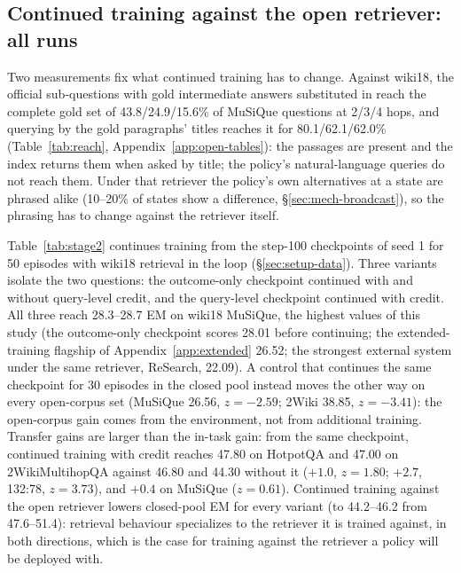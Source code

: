 \subsection{Continued training against the open retriever: all runs}
\label{app:stage2}
Two measurements fix what continued training has to change. Against
wiki18, the official sub-questions with gold intermediate answers
substituted in reach the complete gold set of 43.8/24.9/15.6\% of
MuSiQue questions at 2/3/4 hops, and querying by the gold paragraphs'
titles reaches it for 80.1/62.1/62.0\% (Table~\ref{tab:reach},
Appendix~\ref{app:open-tables}): the passages are present and the index
returns them when asked by title; the policy's natural-language queries
do not reach them. Under that retriever the policy's own alternatives
at a state are phrased alike (10--20\% of states show a difference,
\S\ref{sec:mech-broadcast}), so the phrasing has to change against the
retriever itself.

Table~\ref{tab:stage2} continues training from the step-100
checkpoints of seed 1 for 50 episodes with wiki18 retrieval in the
loop (\S\ref{sec:setup-data}). Three variants isolate the two questions:
the outcome-only checkpoint continued with and without query-level
credit, and the query-level checkpoint continued with credit. All
three reach 28.3--28.7 EM on wiki18 MuSiQue, the highest values of
this study (the outcome-only checkpoint scores 28.01 before continuing;
the extended-training flagship of Appendix~\ref{app:extended} 26.52; the strongest
external system under the same retriever, ReSearch, 22.09). A control
that continues the same checkpoint for 30 episodes in the closed pool
instead moves the other way on every open-corpus set (MuSiQue 26.56,
$z=-2.59$; 2Wiki 38.85, $z=-3.41$): the open-corpus gain comes from the
environment, not from additional training. Transfer gains are larger
than the in-task gain: from the same checkpoint, continued training with
credit reaches 47.80 on HotpotQA and 47.00 on 2WikiMultihopQA against
46.80 and 44.30 without it ($+1.0$, $z=1.80$; $+2.7$, 132:78,
$z=3.73$), and $+0.4$ on MuSiQue ($z=0.61$). Continued training against
the open retriever lowers closed-pool EM for every variant (to 44.2--46.2
from 47.6--51.4): retrieval behaviour specializes to the retriever it
is trained against, in both directions, which is the case for training
against the retriever a policy will be deployed with.

